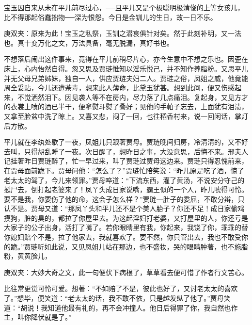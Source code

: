 \begin{parag}
    宝玉因自来从未在平儿前尽过心，──且平儿又是个极聪明极清俊的上等女孩儿，比不得那起俗蠢拙物──深为恨怨。今日是金钏儿的生日，故一日不乐。\begin{note}庚双夹：原来为此！宝玉之私祭，玉钏之潜哀俱针对矣。然于此刻补明，又一法也。真十变万化之文，万法具备，毫无脱漏，真好书也。\end{note}不想落后闹出这件事来，竟得在平儿前稍尽片心，亦今生意中不想之乐也。因歪在床上，心内怡然自得。忽又思及贾琏惟知以淫乐悦己，并不知作养脂粉。又思平儿并无父母兄弟姊妹，独自一人，供应贾琏夫妇二人。贾琏之俗，凤姐之威，他竟能周全妥贴，今儿还遭荼毒，想来此人薄命，比黛玉犹甚。想到此间，便又伤感起来，不觉洒然泪下。因见袭人等不在房内，尽力落了几点痛泪。复起身，又见方才的衣裳上喷的酒已半干，便拿熨斗熨了叠好；见他的手帕子忘去，上面犹有泪渍，又拿至脸盆中洗了晾上。又喜又悲，闷了一回，也往稻香村来，说一回闲话，掌灯后方散。
\end{parag}


\begin{parag}
    平儿就在李纨处歇了一夜，凤姐儿只跟著贾母。贾琏晚间归房，冷清清的，又不好去叫，只得胡乱睡了一夜。次日醒了，想昨日之事，大没意思，后悔不来。邢夫人记挂著昨日贾琏醉了，忙一早过来，叫了贾琏过贾母这边来。贾琏只得忍愧前来，在贾母面前跪下。贾母问他：“怎么了？”贾琏忙陪笑说：“昨儿原是吃了酒，惊了老太太的驾了，今儿来领罪。”贾母啐道：“下流东西，灌了黄汤，不说安分守己的挺尸去，倒打起老婆来了！凤丫头成日家说嘴，霸王似的一个人，昨儿唬得可怜。要不是我，你要伤了他的命，这会子怎么样？”贾琏一肚子的委屈，不敢分辩，只认不是。贾母又道：“那凤丫头和平儿还不是个美人胎子？你还不足！成日家偷鸡摸狗，脏的臭的，都拉了你屋里去。为这起淫妇打老婆，又打屋里的人，你还亏是大家子的公子出身，活打了嘴了。若你眼睛里有我，你起来，我饶了你，乖乖的替你媳妇赔个不是，拉了他家去，我就喜欢了。要不然，你只管出去，我也不敢受你的跪。”贾琏听如此说，又见凤姐儿站在那边，也不盛妆，哭的眼睛肿著，也不施脂粉，黄黄脸儿，\begin{note}庚双夹：大妙大奇之文，此一句便伏下病根了，草草看去便可惜了作者行文苦心。\end{note}比往常更觉可怜可爱。想著：“不如赔了不是，彼此也好了，又讨老太太的喜欢了。”想毕，便笑道：“老太太的话，我不敢不依，只是越发纵了他了。”贾母笑道：“胡说！我知道他最有礼的，再不会冲撞人。他日后得罪了你，我自然也作主，叫你降伏就是了。”
\end{parag}



